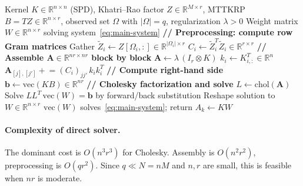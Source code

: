 \documentclass[12pt]{article}
\theoremstyle{definition}
\begin{document}
\begin{algorithm}[H]
\caption{Direct Symmetric Solver for RKHS-CP Mode-$k$ Subproblem}
\label{alg:direct}
\begin{algorithmic}[1]
\Require Kernel $K \in \mathbb{R}^{n\times n}$ (SPD), Khatri--Rao factor $Z \in \mathbb{R}^{M\times r}$, MTTKRP $B = TZ \in \mathbb{R}^{n\times r}$, observed set $\Omega$ with $|\Omega|=q$, regularization $\lambda > 0$
\Ensure Weight matrix $W \in \mathbb{R}^{n\times r}$ solving system~\eqref{eq:main-system}
\Statex
\State \textbf{// Preprocessing: compute row Gram matrices}
    \State Gather $\tilde{Z}_i \leftarrow Z[\Omega_i, :] \in \mathbb{R}^{|\Omega_i|\times r}$ 
    \State $C_i \leftarrow \tilde{Z}_i^T \tilde{Z}_i \in \mathbb{R}^{r\times r}$ 
\EndFor
{}
\Statex
\State \textbf{// Assemble $\mathbf{A} \in \mathbb{R}^{nr\times nr}$ block by block}
\State $\mathbf{A} \leftarrow \lambda\,(I_r \otimes K)$ 
    \State $k_i \leftarrow K_{i,:}^T \in \mathbb{R}^n$ 
            \State $\mathbf{A}_{[j],[j']} \mathrel{+}= (C_i)_{jj'}\,k_i k_i^T$ 
        \EndFor
    \EndFor
\EndFor
{}
\Statex
\State \textbf{// Compute right-hand side}
\State $\mathbf{b} \leftarrow \mathrm{vec}(KB) \in \mathbb{R}^{nr}$ 
\Statex
\State \textbf{// Cholesky factorization and solve}
\State $L \leftarrow \mathrm{chol}(\mathbf{A})$ 
\State Solve $LL^T\,\mathrm{vec}(W) = \mathbf{b}$ by forward/back substitution 
\State Reshape solution to $W \in \mathbb{R}^{n\times r}$
\Statex
\Ensure $\mathrm{vec}(W)$ solves~\eqref{eq:main-system}; return $A_k \leftarrow KW$
\end{algorithmic}
\end{algorithm}

\paragraph{Complexity of direct solver.} The dominant cost is $O(n^3r^3)$ for Cholesky. Assembly is $O(n^2r^2)$, preprocessing is $O(qr^2)$. Since $q \ll N = nM$ and $n, r$ are small, this is feasible when $nr$ is moderate.
\end{document}
